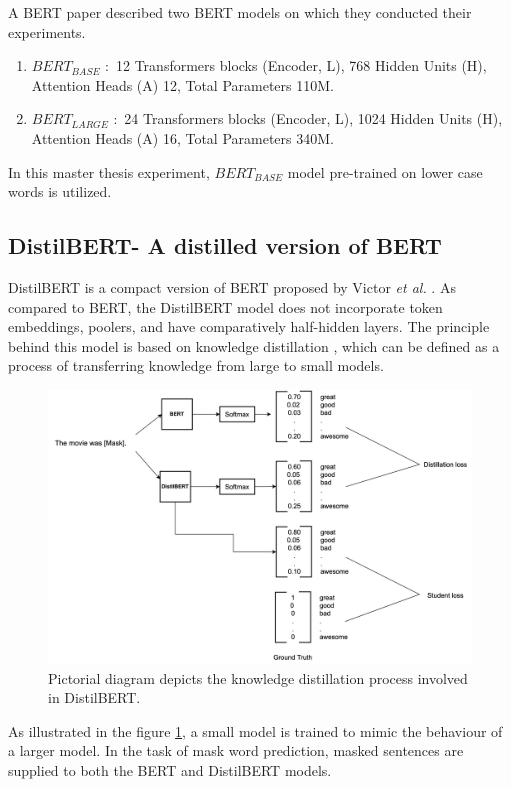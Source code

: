 \documentclass[%
	BCOR=8mm, %
	DIV=12,
	toc=bibliography, %
	toc=listof, %
	oneside, %
	egregdoesnotlikesansseriftitles, %
	]{scrbook}
\begin{document}
A BERT paper \cite{devlin_bert_2019-1} described two BERT models on which they conducted their experiments. 
\begin{enumerate}
    \item $BERT_{BASE}$ $:$ 12 Transformers blocks (Encoder, L), 768 Hidden Units (H), Attention Heads (A) 12, Total Parameters 110M.
    \item $BERT_{LARGE}$ $:$ 24 Transformers blocks (Encoder, L), 1024 Hidden Units (H), Attention Heads (A) 16, Total Parameters 340M.
\end{enumerate}
In this master thesis experiment, $BERT_{BASE}$ model pre-trained on lower case words is utilized. 

\subsection{DistilBERT- A distilled version of BERT}
DistilBERT is a compact version of BERT proposed by Victor \textit{et al.} \cite{sanh_distilbert_2020}. As compared to BERT, the DistilBERT model does not incorporate token embeddings, poolers, and have comparatively half-hidden layers. The principle behind this model is based on knowledge distillation \cite{hinton_distilling_2015}, which can be defined as a process of transferring knowledge from large  to small models. \\
\begin{figure}[H]
    \centering
    \includegraphics[width=0.90\linewidth]{img/DistilBERT.png}
    \caption[Diagram of DistilBERT training.]{ Pictorial diagram depicts the knowledge distillation process involved in  DistilBERT.}
    \label{fig:DistilBERT}
\end{figure}
As illustrated in the figure \ref{fig:DistilBERT}, a small model is trained to mimic the behaviour of a larger model. In the task of mask word prediction, masked sentences are supplied to both the BERT and DistilBERT models.\\
\end{document}

